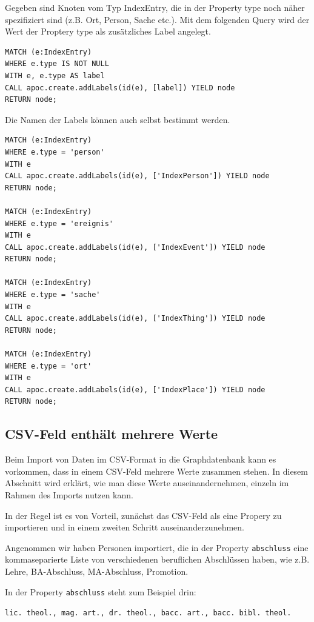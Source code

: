 \documentclass[12pt,ngerman,]{article}
\begin{document}
Gegeben sind Knoten vom Typ IndexEntry, die in der Property type noch
näher spezifiziert sind (z.B. Ort, Person, Sache etc.). Mit dem
folgenden Query wird der Wert der Proptery type als zusätzliches Label
angelegt.

\begin{verbatim}
MATCH (e:IndexEntry)
WHERE e.type IS NOT NULL
WITH e, e.type AS label
CALL apoc.create.addLabels(id(e), [label]) YIELD node
RETURN node;
\end{verbatim}

Die Namen der Labels können auch selbst bestimmt werden.

\begin{verbatim}
MATCH (e:IndexEntry)
WHERE e.type = 'person'
WITH e
CALL apoc.create.addLabels(id(e), ['IndexPerson']) YIELD node
RETURN node;

MATCH (e:IndexEntry)
WHERE e.type = 'ereignis'
WITH e
CALL apoc.create.addLabels(id(e), ['IndexEvent']) YIELD node
RETURN node;

MATCH (e:IndexEntry)
WHERE e.type = 'sache'
WITH e
CALL apoc.create.addLabels(id(e), ['IndexThing']) YIELD node
RETURN node;

MATCH (e:IndexEntry)
WHERE e.type = 'ort'
WITH e
CALL apoc.create.addLabels(id(e), ['IndexPlace']) YIELD node
RETURN node;
\end{verbatim}

\subsection{CSV-Feld enthält mehrere
Werte}\label{csv-feld-enthuxe4lt-mehrere-werte}

Beim Import von Daten im CSV-Format in die Graphdatenbank kann es
vorkommen, dass in einem CSV-Feld mehrere Werte zusammen stehen. In
diesem Abschnitt wird erklärt, wie man diese Werte auseinandernehmen,
einzeln im Rahmen des Imports nutzen kann.

In der Regel ist es von Vorteil, zunächst das CSV-Feld als eine Propery
zu importieren und in einem zweiten Schritt auseinanderzunehmen.

Angenommen wir haben Personen importiert, die in der Property
\texttt{abschluss} eine kommaseparierte Liste von verschiedenen
beruflichen Abschlüssen haben, wie z.B. Lehre, BA-Abschluss,
MA-Abschluss, Promotion.

In der Property \texttt{abschluss} steht zum Beispiel drin:

\texttt{lic.\ theol.,\ mag.\ art.,\ dr.\ theol.,\ bacc.\ art.,\ bacc.\ bibl.\ theol.}
\end{document}
